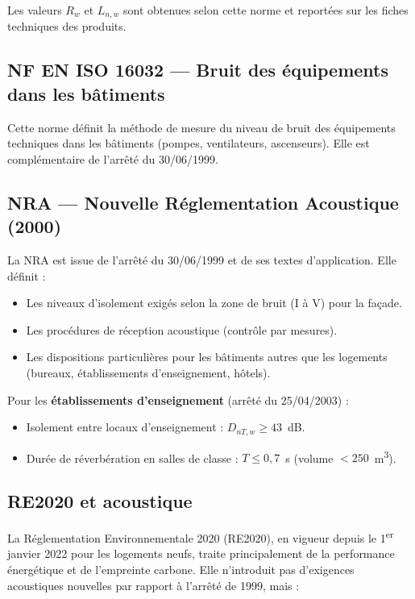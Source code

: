 Les valeurs $R_w$ et $L_{n,w}$ sont obtenues selon cette norme et reportées sur les fiches techniques des produits.

\subsection{NF EN ISO 16032 — Bruit des équipements dans les bâtiments}

Cette norme définit la méthode de mesure du niveau de bruit des équipements techniques dans les bâtiments (pompes, ventilateurs, ascenseurs). Elle est complémentaire de l'arrêté du 30/06/1999.

\subsection{NRA — Nouvelle Réglementation Acoustique (2000)}

La NRA est issue de l'arrêté du 30/06/1999 et de ses textes d'application. Elle définit :
\begin{itemize}
  \item Les niveaux d'isolement exigés selon la zone de bruit (I à V) pour la façade.
  \item Les procédures de réception acoustique (contrôle par mesures).
  \item Les dispositions particulières pour les bâtiments autres que les logements (bureaux, établissements d'enseignement, hôtels).
\end{itemize}

Pour les \textbf{établissements d'enseignement} (arrêté du 25/04/2003) :
\begin{itemize}
  \item Isolement entre locaux d'enseignement : $D_{nT,w} \geq 43$~dB.
  \item Durée de réverbération en salles de classe : $T \leq 0{,}7$~\si{\second} (volume $< 250$~\si{\metre\cubed}).
\end{itemize}

\subsection{RE2020 et acoustique}

La Réglementation Environnementale 2020 (RE2020), en vigueur depuis le 1\textsuperscript{er} janvier 2022 pour les logements neufs, traite principalement de la performance énergétique et de l'empreinte carbone. Elle n'introduit pas d'exigences acoustiques nouvelles par rapport à l'arrêté de 1999, mais :


